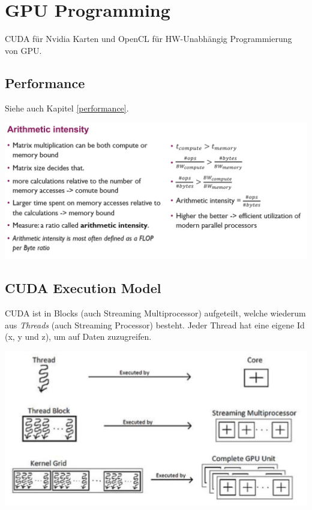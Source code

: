 \section{GPU Programming}
CUDA für Nvidia Karten und OpenCL für HW-Unabhängig Programmierung von GPU.

\subsection{Performance}
Siehe auch Kapitel \ref{performance}.
\begin{center}
	\includegraphics[width=\columnwidth]{Images/intensity}
\end{center}


\subsection{CUDA Execution Model}
CUDA ist in Blocks (auch Streaming Multiprocessor) aufgeteilt, welche wiederum aus \textit{Threads} (auch Streaming Processor) besteht. Jeder Thread hat eine eigene Id (x, y und z), um auf Daten zuzugreifen.

\begin{center}
	\includegraphics[width=0.9\columnwidth]{Images/gpu}
\end{center}

